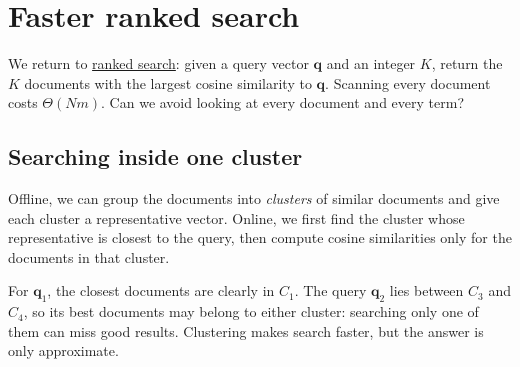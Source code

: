 \documentclass[a4paper,12pt,oneside]{report}
\begin{document}
\section{Faster ranked search}\label{sec:faster-ranked-search}

We return to \hyperref[sec:vector-search]{ranked search}: given a
query vector $\mathbf q$ and an integer $K$, return the $K$ documents
with the largest cosine similarity to $\mathbf q$. Scanning every
document costs $\Theta(Nm)$. Can we avoid looking at every document
and every term?

\subsection{Searching inside one cluster}

Offline, we can group the documents into \emph{clusters} of similar
documents and give each cluster a representative vector. Online, we
first find the cluster whose representative is closest to the query,
then compute cosine similarities only for the documents in that
cluster.

\begin{center}
\end{center}
For $\mathbf q_1$, the closest documents are clearly in $C_1$. The query
$\mathbf q_2$ lies between $C_3$ and $C_4$, so its best documents may
belong to either cluster: searching only one of them can miss good
results. Clustering makes search faster, but the answer is only
approximate.
\end{document}
